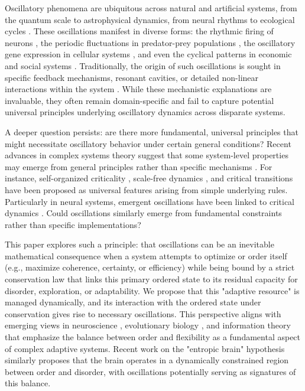 \documentclass[11pt,a4paper]{article}
\begin{document}
Oscillatory phenomena are ubiquitous across natural and artificial systems, from the quantum scale to astrophysical dynamics, from neural rhythms to ecological cycles \cite{Strogatz2015,Pikovsky2003,Buzsaki2006}. These oscillations manifest in diverse forms: the rhythmic firing of neurons \cite{Buzsaki2006}, the periodic fluctuations in predator-prey populations \cite{Winfree2001}, the oscillatory gene expression in cellular systems \cite{Kauffman1993}, and even the cyclical patterns in economic and social systems \cite{Haken2006}. Traditionally, the origin of such oscillations is sought in specific feedback mechanisms, resonant cavities, or detailed non-linear interactions within the system \cite{Winfree2001}. While these mechanistic explanations are invaluable, they often remain domain-specific and fail to capture potential universal principles underlying oscillatory dynamics across disparate systems.

A deeper question persists: are there more fundamental, universal principles that might necessitate oscillatory behavior under certain general conditions? Recent advances in complex systems theory suggest that some system-level properties may emerge from general principles rather than specific mechanisms \cite{Bak1987,Jensen1998,Kello2010,Thurner2018,Morowitz2002}. For instance, self-organized criticality \cite{Bak1987,Hesse2014}, scale-free dynamics \cite{Kello2010,Cavagna2010,Bialek2012}, and critical transitions \cite{Scheffer2009,Scheffer2012} have been proposed as universal features arising from simple underlying rules. Particularly in neural systems, emergent oscillations have been linked to critical dynamics \cite{Beggs2003,Shew2013,Cocchi2017,Chialvo2010}. Could oscillations similarly emerge from fundamental constraints rather than specific implementations?

This paper explores such a principle: that oscillations can be an inevitable mathematical consequence when a system attempts to optimize or order itself (e.g., maximize coherence, certainty, or efficiency) while being bound by a strict conservation law that links this primary ordered state to its residual capacity for disorder, exploration, or adaptability. We propose that this "adaptive resource" is managed dynamically, and its interaction with the ordered state under conservation gives rise to necessary oscillations. This perspective aligns with emerging views in neuroscience \cite{Friston2010,Friston2019,Parr2020}, evolutionary biology \cite{Whitacre2010,Gao2016}, and information theory \cite{Tononi1994,Sporns2000,Mora2011} that emphasize the balance between order and flexibility as a fundamental aspect of complex adaptive systems. Recent work on the "entropic brain" hypothesis \cite{Carhart-Harris2014,Carhart-Harris2018} similarly proposes that the brain operates in a dynamically constrained region between order and disorder, with oscillations potentially serving as signatures of this balance.
\end{document}
